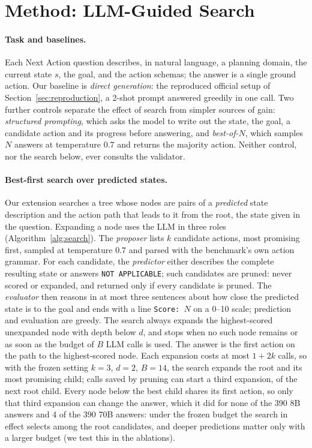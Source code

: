 \section{Method: LLM-Guided Search}
\label{sec:method}

\paragraph{Task and baselines.}
Each Next Action question describes, in natural language, a planning domain, the current state $s$,
the goal, and the action schemas; the answer is a single ground action. Our baseline is
\emph{direct generation}: the reproduced official setup of Section~\ref{sec:reproduction}, a 2-shot
prompt answered greedily in one call. Two further controls separate the effect of search from
simpler sources of gain: \emph{structured prompting}, which asks the model to write out the state,
the goal, a candidate action and its progress before answering, and \emph{best-of-$N$}, which
samples $N$ answers at temperature $0.7$ and returns the majority action. Neither control, nor the
search below, ever consults the validator.

\paragraph{Best-first search over predicted states.}
Our extension searches a tree whose nodes are pairs of a \emph{predicted} state description and the
action path that leads to it from the root, the state given in the question. Expanding a node uses
the LLM in three roles (Algorithm~\ref{alg:search}). The \emph{proposer} lists $k$ candidate actions,
most promising first, sampled at temperature $0.7$ and parsed with the benchmark's own action
grammar. For each candidate, the \emph{predictor} either describes the complete resulting state or
answers \texttt{NOT APPLICABLE}; such candidates are pruned: never scored or expanded, and returned only if every candidate is pruned. The \emph{evaluator}
then reasons in at most three sentences about how close the predicted state is to the goal and ends
with a line \texttt{Score: $N$} on a 0--10 scale; prediction and evaluation are greedy. The search
always expands the highest-scored unexpanded node with depth below $d$, and stops when no such node
remains or as soon as the budget of $B$ LLM calls is used. The answer is the first action on the
path to the highest-scored node. Each expansion costs at most $1 + 2k$ calls, so with the frozen
setting $k{=}3$, $d{=}2$, $B{=}14$, the search expands the root and its most promising child; calls saved by pruning can start a third expansion, of the next root child. Every node below the best child shares its first action, so only that third expansion can change the answer, which it did for none of the 390 8B answers and 4 of the 390 70B answers: under the frozen budget the search in effect selects among the root candidates, and deeper predictions matter only with a larger budget (we test this in the ablations).

